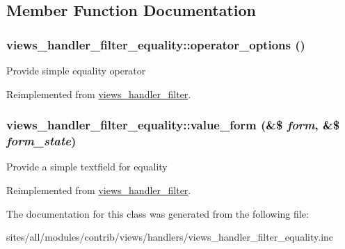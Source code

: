 \subsection{Member Function Documentation}
\hypertarget{classviews__handler__filter__equality_65280b952e08acb863768f6316dbeb33}{
\subsubsection[{operator\_\-options}]{\setlength{\rightskip}{0pt plus 5cm}views\_\-handler\_\-filter\_\-equality::operator\_\-options ()}}
\label{classviews__handler__filter__equality_65280b952e08acb863768f6316dbeb33}


Provide simple equality operator 

Reimplemented from \hyperlink{classviews__handler__filter_cbd69b92e9199530a54069c79368db7f}{views\_\-handler\_\-filter}.\hypertarget{classviews__handler__filter__equality_5ef4270bd7b8fae32e024f6ca6e7a6b8}{
\subsubsection[{value\_\-form}]{\setlength{\rightskip}{0pt plus 5cm}views\_\-handler\_\-filter\_\-equality::value\_\-form (\&\$ {\em form}, \/  \&\$ {\em form\_\-state})}}
\label{classviews__handler__filter__equality_5ef4270bd7b8fae32e024f6ca6e7a6b8}


Provide a simple textfield for equality 

Reimplemented from \hyperlink{classviews__handler__filter_9168b39edae84b20e01a3fd0d810ba66}{views\_\-handler\_\-filter}.

The documentation for this class was generated from the following file:\begin{CompactItemize}
\item 
sites/all/modules/contrib/views/handlers/views\_\-handler\_\-filter\_\-equality.inc\end{CompactItemize}
